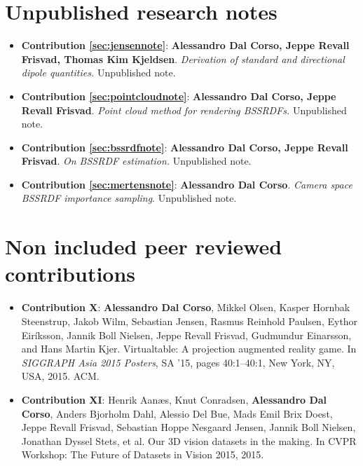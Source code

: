 \section*{Unpublished research notes}
\begin{itemize}
\item  \textbf{Contribution \ref{sec:jensennote}}: \textbf{Alessandro Dal Corso, Jeppe Revall Frisvad, Thomas Kim Kjeldsen}. \textit{Derivation of standard and directional dipole quantities.} Unpublished note. %
\item  \textbf{Contribution \ref{sec:pointcloudnote}}: \textbf{Alessandro Dal Corso, Jeppe Revall Frisvad}. \textit{Point cloud method for rendering BSSRDFs.} Unpublished note. %
\item  \textbf{Contribution \ref{sec:bssrdfnote}}: \textbf{Alessandro Dal Corso, Jeppe Revall Frisvad}. \textit{On BSSRDF estimation.} Unpublished note. %
\item  \textbf{Contribution \ref{sec:mertensnote}}:  \textbf{Alessandro Dal Corso}. \textit{Camera space BSSRDF importance sampling}. Unpublished note. %
\end{itemize}

\section*{Non included peer reviewed contributions}
\begin{itemize}
\item  \textbf{Contribution X}: \textbf{Alessandro Dal Corso}, Mikkel Olsen, Kasper Hornbak Steenstrup, Jakob Wilm, Sebastian Jensen, Rasmus Reinhold Paulsen, Eythor Eiríksson, Jannik Boll Nielsen, Jeppe Revall Frisvad, Gudmundur Einarsson, and Hans Martin Kjer. Virtualtable: A projection augmented reality game. In \textit{SIGGRAPH Asia 2015 Posters}, SA ’15, pages 40:1–40:1, New York, NY, USA, 2015. ACM.~\cite{dalcorsosig15}
\item  \textbf{Contribution XI}: Henrik Aanæs, Knut Conradsen, \textbf{Alessandro Dal Corso}, Anders Bjorholm Dahl, Alessio Del Bue, Mads Emil Brix Doest, Jeppe Revall Frisvad, Sebastian Hoppe Nesgaard Jensen, Jannik Boll Nielsen, Jonathan Dyssel Stets, et al. Our 3D vision datasets in the making. In CVPR Workshop: The Future of Datasets in Vision 2015, 2015.~\cite{aanaes2015our}
\end{itemize}


